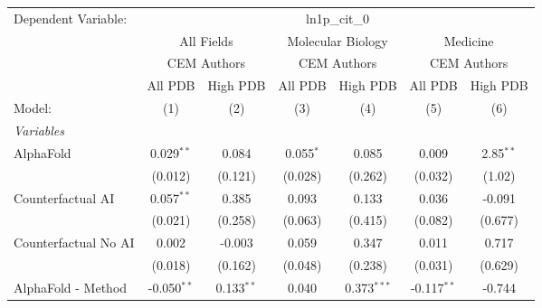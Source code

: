 \begingroup
\centering
\begin{tabular}{lcccccc}
   \tabularnewline \midrule \midrule
   Dependent Variable: & \multicolumn{6}{c}{ln1p\_cit\_0}\\
 & \multicolumn{2}{c}{All Fields} & \multicolumn{2}{c}{Molecular Biology} & \multicolumn{2}{c}{Medicine} \\
\cmidrule(lr){2-3} \cmidrule(lr){4-5} \cmidrule(lr){6-7}
 & \multicolumn{2}{c}{CEM Authors} & \multicolumn{2}{c}{CEM Authors} & \multicolumn{2}{c}{CEM Authors} \\
\cmidrule(lr){2-3} \cmidrule(lr){4-5} \cmidrule(lr){6-7}
 & \multicolumn{1}{c}{All PDB} & \multicolumn{1}{c}{High PDB} & \multicolumn{1}{c}{All PDB} & \multicolumn{1}{c}{High PDB} & \multicolumn{1}{c}{All PDB} & \multicolumn{1}{c}{High PDB} \\
\cmidrule(lr){2-2} \cmidrule(lr){3-3} \cmidrule(lr){4-4} \cmidrule(lr){5-5} \cmidrule(lr){6-6} \cmidrule(lr){7-7}
   Model:                                                     & (1)           & (2)          & (3)          & (4)           & (5)           & (6)\\  
   \midrule
   \emph{Variables}\\
   AlphaFold                                                  & 0.029$^{**}$  & 0.084        & 0.055$^{*}$  & 0.085         & 0.009         & 2.85$^{**}$\\   
                                                              & (0.012)       & (0.121)      & (0.028)      & (0.262)       & (0.032)       & (1.02)\\   
   Counterfactual AI                                          & 0.057$^{**}$  & 0.385        & 0.093        & 0.133         & 0.036         & -0.091\\   
                                                              & (0.021)       & (0.258)      & (0.063)      & (0.415)       & (0.082)       & (0.677)\\   
   Counterfactual No AI                                       & 0.002         & -0.003       & 0.059        & 0.347         & 0.011         & 0.717\\   
                                                              & (0.018)       & (0.162)      & (0.048)      & (0.238)       & (0.031)       & (0.629)\\   
   AlphaFold - Method                                         & -0.050$^{**}$ & 0.133$^{**}$ & 0.040        & 0.373$^{***}$ & -0.117$^{**}$ & -0.744\\   

\end{tabular}
